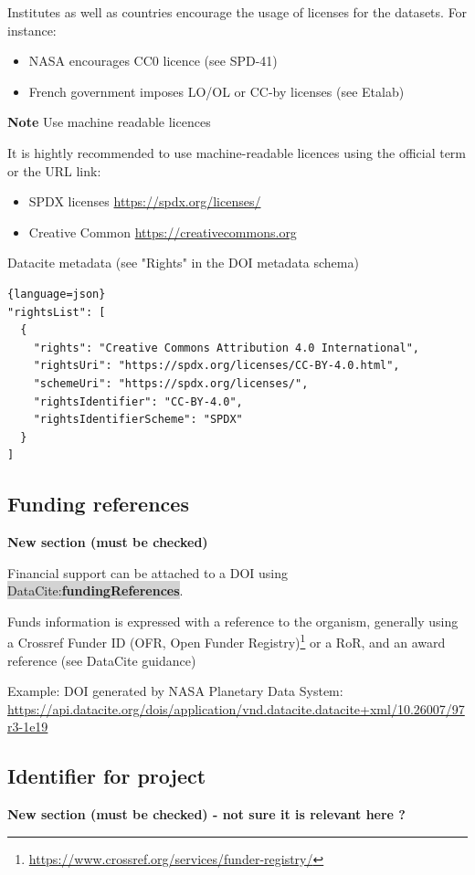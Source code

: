 \documentclass[11pt,a4paper]{ivoa}
\newcommand{\dataciteterm}[1]{\colorbox{lightgray}{DataCite:\textbf{#1}}}
\newcommand{\important}[1]{
	\begin{bigdescription}
		\item \color{ivoacolor}\textbf{Note} #1
	\end{bigdescription}
}
\begin{document}
Institutes as well as countries encourage the usage of licenses for the datasets. For instance:
\begin{itemize}
\item NASA encourages CC0 licence (see SPD-41)
\item French government imposes LO/OL or CC-by licenses (see Etalab)
\end{itemize}


\important{Use machine readable licences}

It is hightly recommended to use machine-readable licences using the official term or the URL link:

\begin{itemize}
\item SPDX licenses \url{https://spdx.org/licenses/}
\item Creative Common \url{https://creativecommons.org}
\end{itemize}

Datacite metadata (see "Rights" in the DOI metadata schema)

\begin{lstlisting}{language=json}
"rightsList": [
  {
    "rights": "Creative Commons Attribution 4.0 International",
    "rightsUri": "https://spdx.org/licenses/CC-BY-4.0.html",
    "schemeUri": "https://spdx.org/licenses/",
    "rightsIdentifier": "CC-BY-4.0",
    "rightsIdentifierScheme": "SPDX"
  }
]
\end{lstlisting}

\subsection{Funding references}
\textbf{\color{red}New section (must be checked)}

Financial support can be attached to a DOI using \dataciteterm{fundingReferences}.

Funds information is expressed with a reference to the organism, generally using a Crossref Funder ID (OFR, Open Funder Registry)\footnote{\url{https://www.crossref.org/services/funder-registry/}} or a RoR, and an award reference (see DataCite guidance)


Example: DOI generated by NASA Planetary Data System:
\url{https://api.datacite.org/dois/application/vnd.datacite.datacite+xml/10.26007/97r3-1e19}



\subsection{Identifier for project}
\textbf{\color{red}New section (must be checked) - not sure it is relevant here ?}
\end{document}
